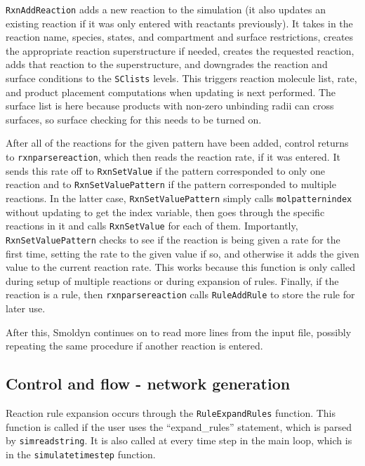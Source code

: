 \documentclass {book}
\begin{document}
\texttt{RxnAddReaction} adds a new reaction to the simulation (it also updates an existing reaction if it was only entered with reactants previously).  It takes in the reaction name, species, states, and compartment and surface restrictions, creates the appropriate reaction superstructure if needed, creates the requested reaction, adds that reaction to the superstructure, and downgrades the reaction and surface conditions to the \texttt{SClists} levels.  This triggers reaction molecule list, rate, and product placement computations when updating is next performed.  The surface list is here because products with non-zero unbinding radii can cross surfaces, so surface checking for this needs to be turned on.

After all of the reactions for the given pattern have been added, control returns to \texttt{rxnparsereaction}, which then reads the reaction rate, if it was entered.  It sends this rate off to \texttt{RxnSetValue} if the pattern corresponded to only one reaction and to \texttt{RxnSetValuePattern} if the pattern corresponded to multiple reactions.  In the latter case, \texttt{RxnSetValuePattern} simply calls \texttt{molpatternindex} without updating to get the index variable, then goes through the specific reactions in it and calls \texttt{RxnSetValue} for each of them.  Importantly, \texttt{RxnSetValuePattern} checks to see if the reaction is being given a rate for the first time, setting the rate to the given value if so, and otherwise it adds the given value to the current reaction rate.  This works because this function is only called during setup of multiple reactions or during expansion of rules.  Finally, if the reaction is a rule, then \texttt{rxnparsereaction} calls \texttt{RuleAddRule} to store the rule for later use.

After this, Smoldyn continues on to read more lines from the input file, possibly repeating the same procedure if another reaction is entered.

\subsection*{Control and flow - network generation}

Reaction rule expansion occurs through the \texttt{RuleExpandRules} function.  This function is called if the user uses the ``expand\_rules'' statement, which is parsed by \texttt{simreadstring}.  It is also called at every time step in the main loop, which is in the \texttt{simulatetimestep} function.
\end{document}
